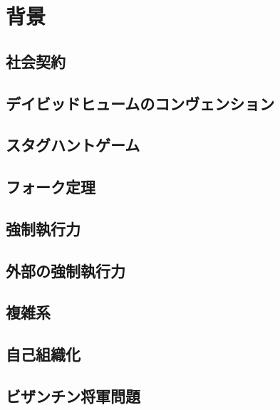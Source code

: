 \chapter{背景}
\section{社会契約}
\section{デイビッドヒュームのコンヴェンション}
\section{スタグハントゲーム}
\section{フォーク定理}
\section{強制執行力}
\section{外部の強制執行力}
\section{複雑系}
\section{自己組織化}
\section{ビザンチン将軍問題}
\section{}
